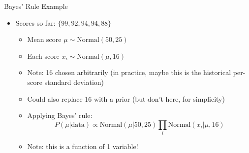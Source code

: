 \documentclass[aspectratio=169]{beamer}
\begin{document}
\begin{frame}{Bayes' Rule Example}

\begin{itemize}
	\item Scores so far: $\{99, 92, 94, 94, 88\}$
	\begin{itemize}
	\item Mean score $\mu \sim \textrm{Normal}(50, 25)$
	\item Each score $x_i \sim \textrm{Normal}(\mu, 16)$
	\item Note: 16 chosen arbitrarily (in practice, maybe this is the historical per-score standard deviation)
	\item Could also replace 16 with a prior (but don't here, for simplicity)
	\item Applying Bayes' rule:
		$$P(\mu | \textrm{data}) \propto \textrm{Normal}(\mu|50, 25) \prod_i \textrm{Normal}(x_i|\mu, 16)$$
	\item Note: this is a function of 1 variable!
	\end{itemize}
\end{itemize}
\end{frame}
\end{document}
